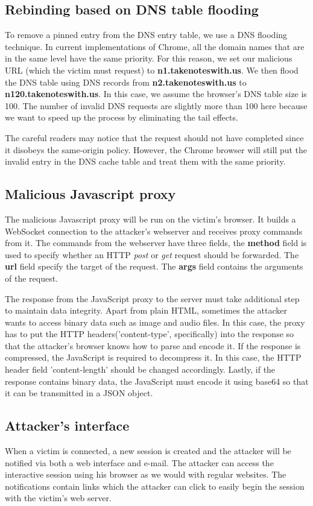\subsection{Rebinding based on DNS table flooding}
To remove a pinned entry from the DNS entry table, we use a DNS flooding technique. In current implementations of Chrome, all the domain names that are in the same level have the same priority. For this reason, we set our malicious URL (which the victim must request) to \textbf{n1.takenoteswith.us}.
We then flood the DNS table using DNS records from \textbf{n2.takenoteswith.us} to \textbf{n120.takenoteswith.us}. In this case, we assume the browser's DNS table size is 100. The number of invalid DNS requests are slightly more than 100 here because we want to speed up the process by eliminating the tail effects.

The careful readers may notice that the request should not have completed since it disobeys the same-origin policy. However, the Chrome browser will still put the invalid entry in the DNS cache table and treat them with the same priority. 

\subsection{Malicious Javascript proxy}
The malicious Javascript proxy will be run on the victim's browser. It builds a WebSocket connection to the attacker's webserver and receives proxy commands from it. The commands from the webserver have three fields, the \textbf{method} field is used to specify whether an HTTP \emph{post} or \emph{get} request should be forwarded. The \textbf{url} field specify the target of the request. The \textbf{args} field contains the arguments of the request.

The response from the JavaScript proxy to the server must take additional step to maintain data integrity. Apart from plain HTML, sometimes the attacker wants to access binary data such as image and audio files. In this case, the proxy has to put the HTTP headers('content-type', specifically) into the response so that the attacker's browser knows how to parse and encode it. If the response is compressed, the JavaScript is required to decompress it. In this case, the HTTP header field 'content-length' should be changed accordingly. Lastly, if the response contains binary data, the JavaScript must encode it using base64 so that it can be transmitted in a JSON object. 

\subsection{Attacker's interface}
When a victim is connected, a new session is created and the attacker will be notified via both a web interface and e-mail. The attacker can access the interactive session using his browser as we would with regular websites. The notifications contain links which the attacker can click to easily begin the session with the victim's web server.

